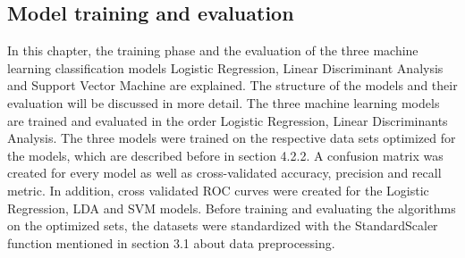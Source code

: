 \documentclass[../masterarbeit.tex]{subfiles}
\begin{document}
	




\subsection{Model training and evaluation}
In this chapter, the training phase and the evaluation of the three machine learning classification models Logistic Regression, Linear Discriminant Analysis and Support Vector Machine are explained. The structure of the models and their evaluation will be discussed in more detail. The three machine learning models are trained and evaluated in the order Logistic Regression, Linear Discriminants Analysis. The three models were trained on the respective data sets optimized for the models, which are described before in section 4.2.2. A confusion matrix was created for every model as well as cross-validated accuracy, precision and recall metric. In addition, cross validated ROC curves were created for the Logistic Regression, LDA and SVM models. Before training and evaluating the algorithms on the optimized sets, the datasets were standardized with the StandardScaler \textcite[]{Sklearn_StandardScaler:2022} function mentioned in section 3.1 about data preprocessing.  \\~\\
\end{document}
